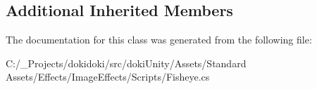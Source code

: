 \subsection*{Additional Inherited Members}


The documentation for this class was generated from the following file\+:\begin{DoxyCompactItemize}
\item 
C\+:/\+\_\+\+Projects/dokidoki/src/doki\+Unity/\+Assets/\+Standard Assets/\+Effects/\+Image\+Effects/\+Scripts/Fisheye.\+cs\end{DoxyCompactItemize}
